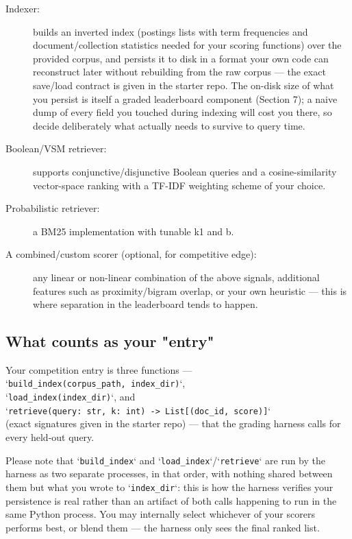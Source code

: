 \documentclass[10pt]{article}
\begin{document}
\begin{description}
	
\item[Indexer:] builds an inverted index (postings lists with term frequencies and document/collection statistics needed for your scoring functions) over the provided corpus, and persists it to disk in a format your own code can reconstruct later without rebuilding from the raw corpus — the exact save/load contract is given in the starter repo. The on-disk size of what you persist is itself a graded leaderboard component (Section 7); a naive dump of every field you touched during indexing will cost you there, so decide deliberately what actually needs to survive to query time.
\item [Boolean/VSM retriever:] supports conjunctive/disjunctive Boolean queries and a cosine-similarity vector-space ranking with a TF-IDF weighting scheme of your choice.
\item [Probabilistic retriever:] a BM25 implementation with tunable k1 and b.
\item [A combined/custom scorer (optional, for competitive edge):] any linear or non-linear combination of the above signals, additional features such as proximity/bigram overlap, or your own heuristic — this is where separation in the leaderboard tends to happen.
\end{description}

\subsection{What counts as your "entry"}
\label{subsec:entry}
Your competition entry is three functions — \\`\texttt{build\_index(corpus\_path, index\_dir)}`,\\ `\texttt{load\_index(index\_dir)}`, and \\ `\texttt{retrieve(query: str, k: int) -> List[(doc\_id, score)]}` \\(exact signatures given in the starter repo) — that the grading harness calls for every held-out query. 

	Please note that `\texttt{build\_index}` and `\texttt{load\_index}`/`\texttt{retrieve}` are run by the harness as two separate processes, in that order, with nothing shared between them but what you wrote to `\texttt{index\_dir}`: this is how the harness verifies your persistence is real rather than an artifact of both calls happening to run in the same Python process. You may internally select whichever of your scorers performs best, or blend them — the harness only sees the final ranked list.
\end{document}

